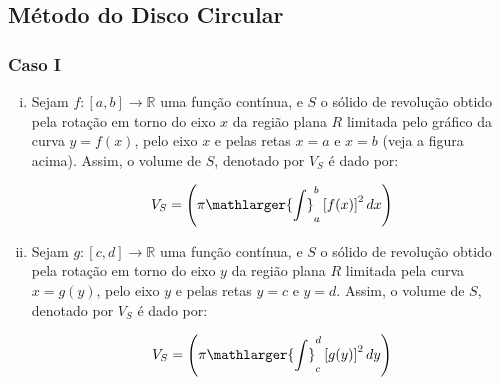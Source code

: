 \cleardoublepage\documentclass[../main.tex]{subfiles}
\begin{document}
\subsection{Método do Disco Circular}
\subsubsection*{Caso I}
\begin{enumerate}[i.]
    \item Sejam \(f:[a,b] \to \mathbb{R}\) uma função contínua, e \(S\) o sólido de revolução obtido pela rotação em torno do eixo \(x\) da região plana \(R\) limitada pelo gráfico da curva \(y=f(x)\), pelo eixo \(x\) e pelas retas \(x=a\) e \(x=b\) (veja a figura acima). Assim, o volume de \(S\), denotado por \(V_S\) é dado por:

\[ V_S= \left( \pi \mathlarger{\int}^{b}_{a}\left[ f(x)\right]^2dx \right)\]
\item Sejam \(g:[c,d] \to \mathbb{R}\) uma função contínua, e \(S\) o sólido de revolução obtido pela rotação em torno do eixo \(y\) da região plana \(R\) limitada pela curva \(x=g(y)\), pelo eixo \(y\) e pelas retas \(y=c\) e \(y=d\). Assim, o volume de \(S\), denotado por \(V_S\) é dado por:

\[ V_S= \left( \pi \mathlarger{\int}^{d}_{c}\left[ g(y)\right]^2dy \right) \]
\end{enumerate}
\end{document}
